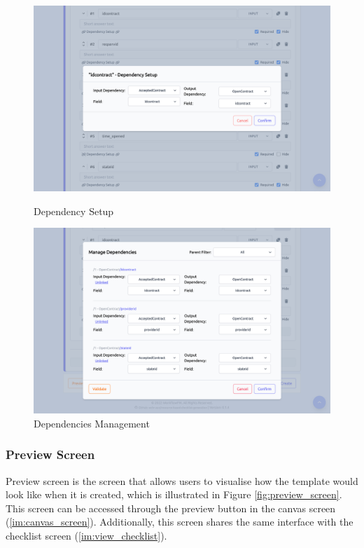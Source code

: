 \begin{figure}[ht!]
\centering
\begin{minipage}{.5\textwidth}
  \centering
  \includegraphics[width=0.9\linewidth]{overleaf/images/screens/edit_dependencies_2.png}
  \caption{Dependency Setup}
  \label{fig:edit_dependencies_2}
\end{minipage}%
\begin{minipage}{.5\textwidth}
  \centering
  \includegraphics[width=0.9\linewidth]{overleaf/images/screens/edit_dependencies.png}
  \caption{Dependencies Management}
  \label{fig:edit_dependencies}
\end{minipage}
\end{figure}

\subsubsection{Preview Screen}
\label{im:preview_screen}

Preview screen is the screen that allows users to visualise how the template would look like when it is created, which is illustrated in Figure \ref{fig:preview_screen}. This screen can be accessed through the preview button in the canvas screen (\ref{im:canvas_screen}). Additionally, this screen shares the same interface with the checklist screen (\ref{im:view_checklist}).



